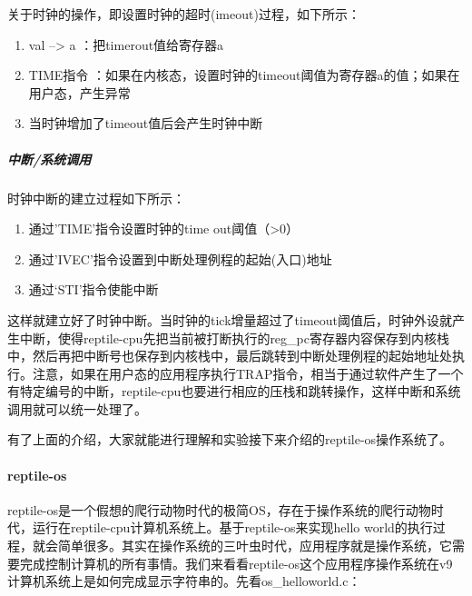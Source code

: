 关于时钟的操作，即设置时钟的超时(imeout)过程，如下所示：
\begin{enumerate}
\item val --> a  ：把timerout值给寄存器a
\item TIME指令 ：如果在内核态，设置时钟的timeout阈值为寄存器a的值；如果在用户态，产生异常
\item 当时钟增加了timeout值后会产生时钟中断
\end{enumerate}

\subparagraph{中断/系统调用}

时钟中断的建立过程如下所示：
\begin{enumerate}
\item 通过'TIME'指令设置时钟的time out阈值（>0）
\item 通过'IVEC'指令设置到中断处理例程的起始(入口)地址
\item 通过‘STI’指令使能中断
\end{enumerate}

这样就建立好了时钟中断。当时钟的tick增量超过了timeout阈值后，时钟外设就产生中断，使得reptile-cpu先把当前被打断执行的reg\_pc寄存器内容保存到内核栈中，然后再把中断号也保存到内核栈中，最后跳转到中断处理例程的起始地址处执行。注意，如果在用户态的应用程序执行TRAP指令，相当于通过软件产生了一个有特定编号的中断，reptile-cpu也要进行相应的压栈和跳转操作，这样中断和系统调用就可以统一处理了。

有了上面的介绍，大家就能进行理解和实验接下来介绍的reptile-os操作系统了。

\paragraph{reptile-os}
reptile-os是一个假想的爬行动物时代的极简OS，存在于操作系统的爬行动物时代，运行在reptile-cpu计算机系统上。基于reptile-os来实现hello world的执行过程，就会简单很多。其实在操作系统的三叶虫时代，应用程序就是操作系统，它需要完成控制计算机的所有事情。我们来看看reptile-os这个应用程序操作系统在v9计算机系统上是如何完成显示字符串的。先看os\_helloworld.c：
 
